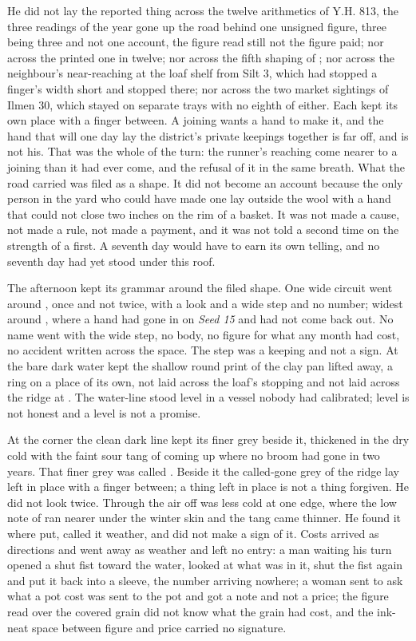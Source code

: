 He did not lay the reported thing across the twelve arithmetics of Y.H. 813, the three readings of the year gone up the road behind one unsigned figure, three being three and not one account, the figure read still not the figure paid; nor across the printed one in twelve; nor across the fifth shaping of ; nor across the neighbour's near-reaching at the loaf shelf from Silt 3, which had stopped a finger's width short and stopped there; nor across the two market sightings of Ilmen 30, which stayed on separate trays with no eighth of either. Each kept its own place with a finger between. A joining wants a hand to make it, and the hand that will one day lay the district's private keepings together is far off, and is not his. That was the whole of the turn: the runner's reaching come nearer to a joining than it had ever come, and the refusal of it in the same breath. What the road carried was filed as a shape. It did not become an account because the only person in the yard who could have made one lay outside the wool with a hand that could not close two inches on the rim of a basket. It was not made a cause, not made a rule, not made a payment, and it was not told a second time on the strength of a first. A seventh day would have to earn its own telling, and no seventh day had yet stood under this roof.

The afternoon kept its grammar around the filed shape. One wide circuit went around , once and not twice, with a look and a wide step and no number; widest around , where a hand had gone in on \emph{Seed 15} and had not come back out. No name went with the wide step, no body, no figure for what any month had cost, no accident written across the space. The step was a keeping and not a sign. At  the bare dark water kept the shallow round print of the clay pan lifted away, a ring on a place of its own, not laid across the loaf's stopping and not laid across the ridge at . The water-line stood level in a vessel nobody had calibrated; level is not honest and a level is not a promise.

At the corner the clean dark line kept its finer grey beside it, thickened in the dry cold with the faint sour tang of  coming up where no broom had gone in two years. That finer grey was called . Beside it the called-gone grey of the ridge lay left in place with a finger between; a thing left in place is not a thing forgiven. He did not look twice. Through  the air off  was less cold at one edge, where the low note of  ran nearer under the winter skin and the tang came thinner. He found it where put, called it weather, and did not make a sign of it. Costs arrived as directions and went away as weather and left no entry: a man waiting his turn opened a shut fist toward the water, looked at what was in it, shut the fist again and put it back into a sleeve, the number arriving nowhere; a woman sent to ask what a pot cost was sent to the pot and got a note and not a price; the figure read over the covered grain did not know what the grain had cost, and the ink-neat space between figure and price carried no signature.

